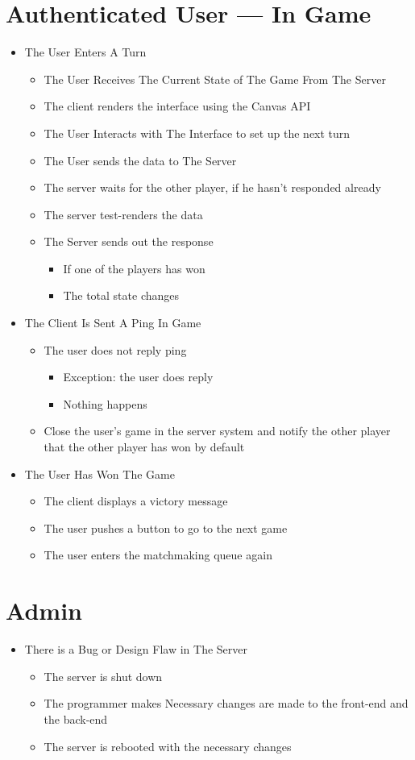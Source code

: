 \documentclass[11pt]{article}
\begin{document}
\section{Authenticated User --- In Game}
\label{sec:org33edf11}
\begin{itemize}
\item The User Enters A Turn
\begin{itemize}
\item The User Receives The Current State of The Game From The Server
\item The client renders the interface using the Canvas API
\item The User Interacts with The Interface to set up the next turn
\item The User sends the data to The Server
\item The server waits for the other player, if he hasn't responded already
\item The server test-renders the data
\item The Server sends out the response
\begin{itemize}
\item If one of the players has won
\item The total state changes
\end{itemize}
\end{itemize}
\item The Client Is Sent A Ping In Game
\begin{itemize}
\item The user does not reply ping
\begin{itemize}
\item Exception: the user does reply
\item Nothing happens
\end{itemize}
\item Close the user's game in the server system and notify the other player that the other 
player has won by default
\end{itemize}
\item The User Has Won The Game
\begin{itemize}
\item The client displays a victory message
\item The user pushes a button to go to the next game
\item The user enters the matchmaking queue again
\end{itemize}
\end{itemize}
\section{Admin}
\label{sec:orga7e3492}
\begin{itemize}
\item There is a Bug or Design Flaw in The Server
\begin{itemize}
\item The server is shut down
\item The programmer makes Necessary changes are made to the front-end and the back-end
\item The server is rebooted with the necessary changes
\end{itemize}
\end{itemize}
\end{document}
